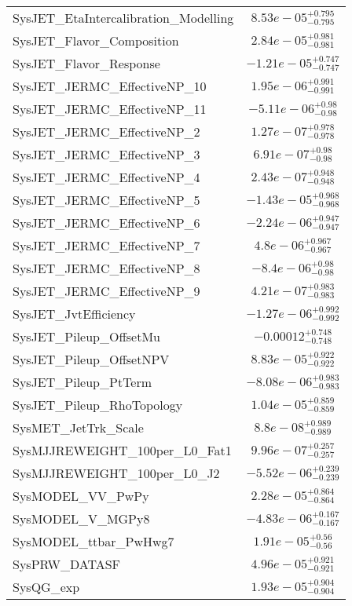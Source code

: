 \begin{tabular}{|l|c|}
SysJET\_EtaIntercalibration\_Modelling & $8.53e-05^{+0.795}_{-0.795}$ \\
SysJET\_Flavor\_Composition & $2.84e-05^{+0.981}_{-0.981}$ \\
SysJET\_Flavor\_Response & $-1.21e-05^{+0.747}_{-0.747}$ \\
SysJET\_JERMC\_EffectiveNP\_10 & $1.95e-06^{+0.991}_{-0.991}$ \\
SysJET\_JERMC\_EffectiveNP\_11 & $-5.11e-06^{+0.98}_{-0.98}$ \\
SysJET\_JERMC\_EffectiveNP\_2 & $1.27e-07^{+0.978}_{-0.978}$ \\
SysJET\_JERMC\_EffectiveNP\_3 & $6.91e-07^{+0.98}_{-0.98}$ \\
SysJET\_JERMC\_EffectiveNP\_4 & $2.43e-07^{+0.948}_{-0.948}$ \\
SysJET\_JERMC\_EffectiveNP\_5 & $-1.43e-05^{+0.968}_{-0.968}$ \\
SysJET\_JERMC\_EffectiveNP\_6 & $-2.24e-06^{+0.947}_{-0.947}$ \\
SysJET\_JERMC\_EffectiveNP\_7 & $4.8e-06^{+0.967}_{-0.967}$ \\
SysJET\_JERMC\_EffectiveNP\_8 & $-8.4e-06^{+0.98}_{-0.98}$ \\
SysJET\_JERMC\_EffectiveNP\_9 & $4.21e-07^{+0.983}_{-0.983}$ \\
SysJET\_JvtEfficiency & $-1.27e-06^{+0.992}_{-0.992}$ \\
SysJET\_Pileup\_OffsetMu & $-0.00012^{+0.748}_{-0.748}$ \\
SysJET\_Pileup\_OffsetNPV & $8.83e-05^{+0.922}_{-0.922}$ \\
SysJET\_Pileup\_PtTerm & $-8.08e-06^{+0.983}_{-0.983}$ \\
SysJET\_Pileup\_RhoTopology & $1.04e-05^{+0.859}_{-0.859}$ \\
SysMET\_JetTrk\_Scale & $8.8e-08^{+0.989}_{-0.989}$ \\
SysMJJREWEIGHT\_100per\_L0\_Fat1 & $9.96e-07^{+0.257}_{-0.257}$ \\
SysMJJREWEIGHT\_100per\_L0\_J2 & $-5.52e-06^{+0.239}_{-0.239}$ \\
SysMODEL\_VV\_PwPy & $2.28e-05^{+0.864}_{-0.864}$ \\
SysMODEL\_V\_MGPy8 & $-4.83e-06^{+0.167}_{-0.167}$ \\
SysMODEL\_ttbar\_PwHwg7 & $1.91e-05^{+0.56}_{-0.56}$ \\
SysPRW\_DATASF & $4.96e-05^{+0.921}_{-0.921}$ \\
SysQG\_exp & $1.93e-05^{+0.904}_{-0.904}$ \\

\end{tabular}
